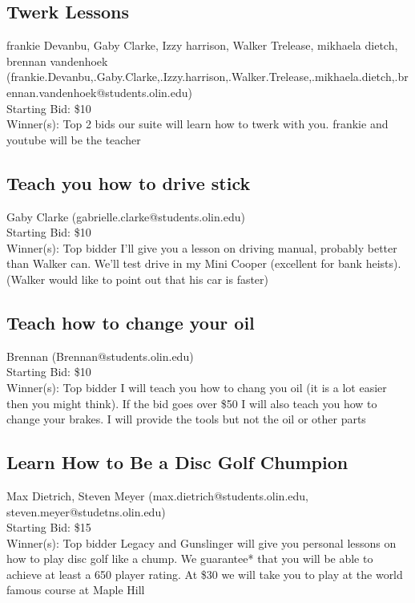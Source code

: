 \documentclass[11pt]{article}
\begin{document}
\subsection{Twerk Lessons}
frankie Devanbu, Gaby Clarke, Izzy harrison, Walker Trelease, mikhaela dietch, brennan vandenhoek (frankie.Devanbu,.Gaby.Clarke,.Izzy.harrison,.Walker.Trelease,.mikhaela.dietch,.brennan.vandenhoek@students.olin.edu) \\
Starting Bid: \$10 \\
Winner(s): 
Top 2 bids\newline
our suite will learn how to twerk with you. frankie and youtube will be the teacher
\subsection{Teach you how to drive stick}
Gaby Clarke (gabrielle.clarke@students.olin.edu) \\
Starting Bid: \$10 \\
Winner(s): 
Top bidder\newline
I'll give you a lesson on driving manual, probably better than Walker can. We'll test drive in my Mini Cooper (excellent for bank heists). (Walker would like to point out that his car is faster)
\subsection{Teach how to change your oil}
Brennan  (Brennan@students.olin.edu) \\
Starting Bid: \$10 \\
Winner(s): 
Top bidder\newline
I will teach you how to chang you oil (it is a lot easier then you might think). If the bid goes over \$50 I will also teach you how to change your brakes. I will provide the tools but not the oil or other parts
\subsection{Learn How to Be a Disc Golf Chumpion}
Max Dietrich, Steven Meyer (max.dietrich@students.olin.edu, steven.meyer@studetns.olin.edu) \\
Starting Bid: \$15 \\
Winner(s): 
Top bidder\newline
Legacy and Gunslinger will give you personal lessons on how to play disc golf like a chump.  We guarantee* that you will be able to achieve at least a 650 player rating.  At \$30 we will take you to play at the world famous course at Maple Hill
\end{document}
